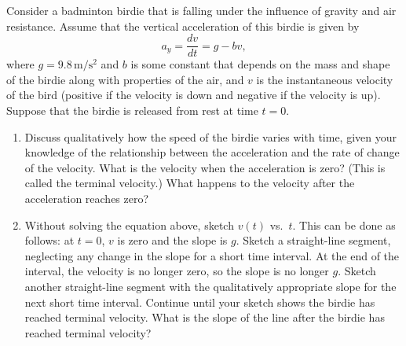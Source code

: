 \begin{exercise}  Consider a badminton birdie that is
  falling under the influence of gravity and air resistance.  Assume
  that the vertical acceleration of this birdie is given by
  \[ a_y = \frac{dv}{dt} = g - bv, \] 
  where $g = 9.8\,\text{m}/\text{s}^2$ and $b$ is some constant that
  depends on the mass and shape of the birdie along with properties of
  the air, and $v$ is the instantaneous velocity of the bird (positive
  if the velocity is down and negative if the velocity is up).
  Suppose that the birdie is released from rest at time $t=0$.

  \begin{enumerate}

  \item Discuss qualitatively how the speed of the birdie varies with
    time, given your knowledge of the relationship between the
    acceleration and the rate of change of the velocity.  What is the
    velocity when the acceleration is zero?  (This is called the
    terminal velocity.)  What happens to the velocity after the
    acceleration reaches zero?

  \item Without solving the equation above, sketch $v(t)$ vs.\ $t$.
    This can be done as follows: at $t=0$, $v$ is zero and the slope
    is $g$.  Sketch a straight-line segment, neglecting any change in
    the slope for a short time interval. At the end of the interval,
    the velocity is no longer zero, so the slope is no longer $g$.
    Sketch another straight-line segment with the qualitatively
    appropriate slope for the next short time interval.  Continue
    until your sketch shows the birdie has reached terminal velocity.
    What is the slope of the line after the birdie has reached
    terminal velocity?
  \end{enumerate}
  \label{prob:falling_birdie}
\end{exercise}

